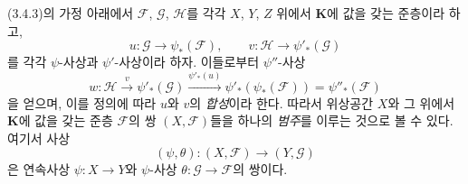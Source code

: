 \begin{env}[3.5.2]
\label{0.3.5.2-ko}
(3.4.3)의 가정 아래에서 $\mathcal F$, $\mathcal G$, $\mathcal H$를 각각 $X$, $Y$, $Z$ 위에서 $\mathbf K$에 값을 갖는 준층이라 하고,
\[
  u:\mathcal G\longrightarrow\psi_*(\mathcal F),
  \qquad
  v:\mathcal H\longrightarrow\psi'_*(\mathcal G)
\]
를 각각 $\psi$-사상과 $\psi'$-사상이라 하자. 이들로부터 $\psi''$-사상
\[
  w:\mathcal H\xrightarrow{v}\psi'_*(\mathcal G)
  \xrightarrow{\psi'_*(u)}
  \psi'_*(\psi_*(\mathcal F))=\psi''_*(\mathcal F)
\]
을 얻으며, 이를 정의에 따라 $u$와 $v$의 \emph{합성}이라 한다. 따라서 위상공간 $X$와 그 위에서 $\mathbf K$에 값을 갖는 준층 $\mathcal F$의 쌍 $(X,\mathcal F)$들을 하나의 \emph{범주}를 이루는 것으로 볼 수 있다. 여기서 사상
\[
  (\psi,\theta):(X,\mathcal F)\longrightarrow(Y,\mathcal G)
\]
은 연속사상 $\psi:X\to Y$와 $\psi$-사상 $\theta:\mathcal G\to\mathcal F$의 쌍이다.
\end{env}

